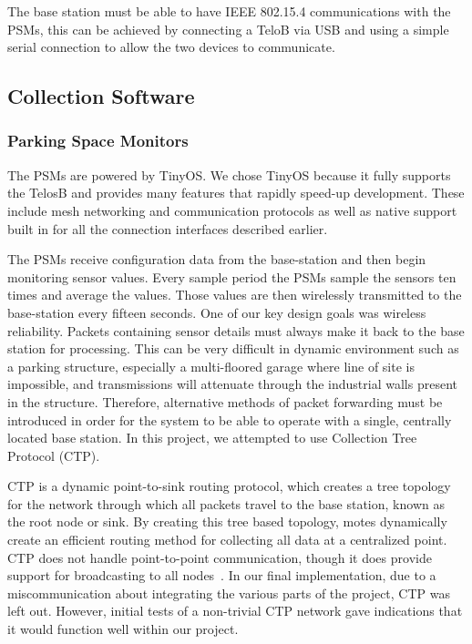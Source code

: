 \documentclass{acm_proc}
\begin{document}
The base station must be able to have IEEE 802.15.4 communications with the
PSMs, this can be achieved by connecting a TeloB via USB and using a simple
serial connection to allow the two devices to communicate.  

\subsection{Collection Software}

\subsubsection{Parking Space Monitors}

The PSMs are powered by TinyOS.
We chose TinyOS because it fully supports the TelosB and provides many
features that rapidly speed-up development.
These include mesh networking and communication protocols as well as native
support built in for all the connection interfaces described earlier.

The PSMs receive configuration data from the base-station and then begin
monitoring sensor values.
Every sample period the PSMs sample the sensors ten times and average the
values.
Those values are then wirelessly transmitted to the base-station every
fifteen seconds.
One of our key design goals was wireless reliability.
Packets containing sensor details must always make it back to the base station for processing.
This can be very difficult in dynamic environment such as a parking
structure, especially a multi-floored garage where line of site is
impossible, and transmissions will attenuate through the industrial walls present in the structure.
Therefore, alternative methods of packet forwarding must be introduced in
order for the system to be able to operate with a single, centrally located
base station.
In this project, we attempted to use Collection Tree Protocol (CTP).

CTP is a dynamic point-to-sink routing protocol, which creates a tree
topology for the network through which all packets travel to the base
station, known as the root node or sink.  By creating this tree based
topology, motes dynamically create an efficient routing method for
collecting all data at a centralized point.  CTP does not handle
point-to-point communication, though it does provide support for
broadcasting to all nodes~\cite{tep123:collection-tree-protocol}.
In our final implementation, due to a miscommunication about integrating
the various parts of the project, CTP was left out.
However, initial tests of a non-trivial CTP network gave indications that
it would function well within our project.
\end{document}
